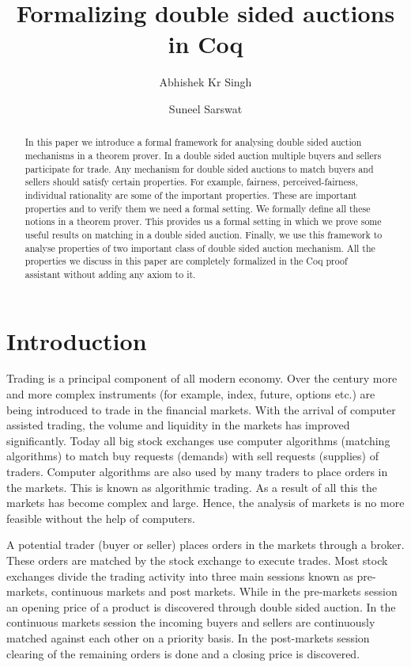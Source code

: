 \documentclass[a4paper,UKenglish,cleveref, autoref]{lipics-v2019}
\title{Formalizing double sided auctions in Coq} %
\author{Abhishek Kr Singh}{Tata Institute of Fundamental Research, India} {abhishek.uor@gmail.com}
{}{}
\author{Suneel Sarswat}{Tata Institute of Fundamental Research, India} {suneel.sarswat@gmail.com}
{}{}
\begin{document}
\newcommand{\tw}{\texttt}

\maketitle

\begin{abstract}

In this paper we introduce a formal framework for analysing double sided auction mechanisms in a theorem prover. In a double sided auction multiple buyers and sellers participate for trade. Any mechanism for double sided auctions to match buyers and sellers should satisfy certain properties. For example, fairness, perceived-fairness, individual rationality are some of the important properties. These are important properties and to verify them we need a formal setting. We formally define all these notions in a theorem prover. This provides us a  formal setting in which we prove some useful results on matching in a double sided auction. Finally, we use this framework to analyse properties of two important class of double sided auction mechanism. All the properties we discuss in this paper are completely formalized in the Coq proof assistant without adding any axiom to it.  
\end{abstract}

\section{Introduction}
\label{section1}

Trading is a principal component of all modern economy. Over the century more and more complex instruments (for example, index, future, options etc.) are being introduced to trade in the financial markets. With the arrival of computer assisted trading, the volume and liquidity in the markets has improved significantly. Today all big stock exchanges use computer algorithms (matching algorithms) to match buy requests (demands) with sell requests (supplies) of traders. Computer algorithms are also used by many traders to place orders  in the markets. This is known as algorithmic trading.  As a result of all this the markets has become complex and large. Hence, the analysis of markets is no more feasible without the help of computers. 

A potential trader (buyer or seller) places orders in the markets through a broker. These orders are matched by the stock exchange to execute trades. Most stock exchanges divide the trading activity into three main sessions known as pre-markets, continuous markets and post markets. While in the pre-markets session an opening price of a product is discovered through double sided auction. In the continuous markets session the incoming buyers and sellers are continuously matched against each other on a priority basis. In the post-markets session clearing of the remaining orders is done and a closing price is discovered.
\end{document}
